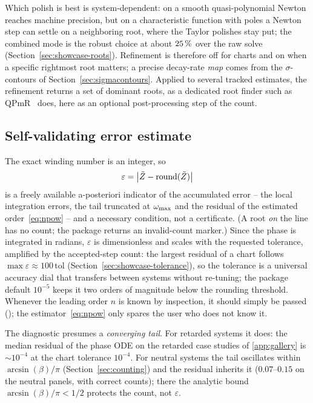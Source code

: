 Which polish is best is system-dependent: on a smooth quasi-polynomial Newton
reaches machine precision, but on a characteristic function with poles a
Newton step can settle on a neighboring root, where the Taylor polishes stay
put; the combined mode is the robust choice at about $25\,\%$ over
the raw solve (Section~\ref{sec:showcase-roots}). Refinement is therefore off
for charts and on when a specific rightmost root matters; a precise
decay-rate \emph{map} comes from the $\sigma$-contours of
Section~\ref{sec:sigmacontours}. Applied to several tracked estimates, the
refinement returns a set of dominant roots, as a dedicated root finder such as
QPmR~\cite{vyhlidal2009mapping} does, here as an optional post-processing
step of the count.

\subsection{Self-validating error estimate}\label{sec:integerness}

The exact winding number is an integer, so
\begin{equation}\label{eq:eps}
  \varepsilon = \bigl|\tilde{Z} - \operatorname{round}(\tilde{Z})\bigr|
\end{equation}
is a freely available a-posteriori indicator of the accumulated error -- the
local integration errors, the tail truncated at $\omega_{\mathrm{max}}$ and the residual of
the estimated order~\eqref{eq:npow} -- and a necessary condition, not a
certificate. (A root \emph{on} the line has no count; the package returns an
invalid-count marker.) Since the phase is integrated in radians, $\varepsilon$
is dimensionless and scales with the requested tolerance, amplified by the
accepted-step count: the largest residual of a chart follows
$\max\varepsilon\approx100\,\mathrm{tol}$ (Section~\ref{sec:showcase-tolerance}),
so the tolerance is a universal accuracy dial that transfers between systems
without re-tuning; the package default $10^{-5}$ keeps it two orders of
magnitude below the rounding threshold. Whenever the leading order $n$ is
known by inspection, it should simply be passed (); the
estimator~\eqref{eq:npow} only spares the user who does not know it.

The diagnostic presumes a \emph{converging tail}. For retarded systems it
does: the median residual of the phase ODE on the retarded case studies of
\ref{app:gallery} is $\sim10^{-4}$ at the chart tolerance $10^{-4}$. For
neutral systems the tail oscillates within $\arcsin(\beta)/\pi$
(Section~\ref{sec:counting}) and the residual inherits it ($0.07$--$0.15$ on
the neutral panels, with correct counts); there the analytic bound
$\arcsin(\beta)/\pi<1/2$ protects the count, not $\varepsilon$.

